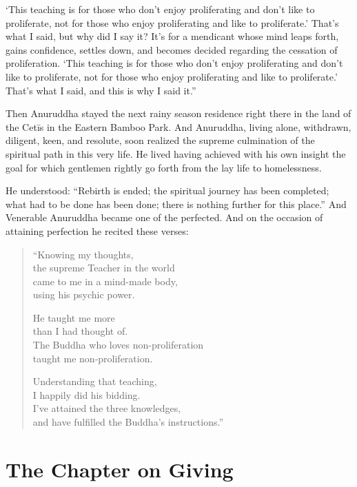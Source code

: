 \documentclass[12pt,openany]{book}%
\let\oldcontentsline\contentsline
\newcommand{\nopagecontentsline}[3]{\oldcontentsline{#1}{#2}{}}
\newcommand*{\tocchapterline}[1]{\bfseries\itshape{#1}}
\begin{document}
‘This teaching is for those who don’t enjoy proliferating and don’t like to proliferate, not for those who enjoy proliferating and like to proliferate.’ That’s what I said, but why did I say it? It’s for a mendicant whose mind leaps forth, gains confidence, settles down, and becomes decided regarding the cessation of proliferation. ‘This teaching is for those who don’t enjoy proliferating and don’t like to proliferate, not for those who enjoy proliferating and like to proliferate.’ That’s what I said, and this is why I said it.” 

Then Anuruddha stayed the next rainy season residence right there in the land of the \textsanskrit{Cetīs} in the Eastern Bamboo Park. And Anuruddha, living alone, withdrawn, diligent, keen, and resolute, soon realized the supreme culmination of the spiritual path in this very life. He lived having achieved with his own insight the goal for which gentlemen rightly go forth from the lay life to homelessness. 

He understood: “Rebirth is ended; the spiritual journey has been completed; what had to be done has been done; there is nothing further for this place.” And Venerable Anuruddha became one of the perfected. And on the occasion of attaining perfection he recited these verses: 

\begin{verse}%
“Knowing my thoughts, \\
the supreme Teacher in the world \\
came to me in a mind-made body, \\
using his psychic power. 

He taught me more \\
than I had thought of. \\
The Buddha who loves non-proliferation \\
taught me non-proliferation. 

Understanding that teaching, \\
I happily did his bidding. \\
I’ve attained the three knowledges, \\
and have fulfilled the Buddha’s instructions.” 

%
\end{verse}

%
\chapter*{The Chapter on Giving }
\addcontentsline{toc}{chapter}{\tocchapterline{The Chapter on Giving }}
\addtocontents{toc}{\let\protect\contentsline\protect\oldcontentsline}
\end{document}
